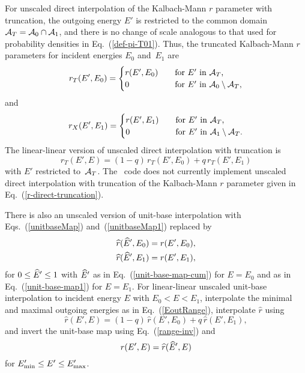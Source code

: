 {For unscaled direct interpolation of the Kalbach-Mann $r$ parameter with
truncation, the outgoing energy $E'$ is restricted to the common 
domain ${\cal A}_T = {\cal A}_0 \cap {\cal A}_1$, and there is no change
of scale analogous to that used for probability densities in
Eq.~(\ref{def-pi-T01}).  Thus, the truncated Kalbach-Mann $r$ parameters
for incident energies $E_0$ and~$E_1$ are
\begin{equation*}
  r_T(E', E_0 ) = \begin{cases}
    r(E', E_0 ) &\quad \text{for $E'$ in ${\cal A}_T$,} \\
    0 &\quad \text{for $E'$ in ${\cal A}_0 \setminus {\cal A}_T$,}
  \end{cases}
\end{equation*}
and
\begin{equation*}
  r_X(E', E_1 ) = \begin{cases}
    r(E', E_1 ) &\quad \text{for $E'$ in ${\cal A}_T$,} \\
    0 &\quad \text{for $E'$ in ${\cal A}_1 \setminus {\cal A}_T$.}
  \end{cases}
\end{equation*}
The linear-linear version of unscaled direct
interpolation with truncation is
\begin{equation}
  r_T(E', E ) = ( 1 - q )\, r_T(E', E_0 ) + q\, r_T(E', E_1 )
  \label{r-direct-truncation}
\end{equation}
with $E'$ restricted to~${\cal A}_T$.
The \gettransfer\ code does not currently implement unscaled direct
interpolation with truncation of the Kalbach-Mann $r$ parameter
given in Eq.~(\ref{r-direct-truncation}).

There is also an unscaled version of unit-base interpolation with
Eqs.~(\ref{unitbaseMap}) and~(\ref{unitbaseMap1}) replaced by
\begin{equation*}
 \begin{split}
  \widehat r(\widehat E', E_0) &= r(E', E_0), \\
  \widehat r(\widehat E', E_1) &= r(E', E_1), \\
 \end{split}
\end{equation*}
for $0 \le \widehat E' \le 1$ with $\widehat E'$ as in Eq.~(\ref{unit-base-map-cum})
for $E = E_0$ and as in Eq.~(\ref{unit-base-map1})
for $E = E_1$.  For linear-linear unscaled unit-base interpolation
to incident energy $E$ with $E_0 < E < E_1$, interpolate the
minimal and maximal outgoing energies as in Eq.~(\ref{EoutRange}),
interpolate $\widehat r$ using
$$
    \widehat r(E', E ) = ( 1 - q )\, \widehat r(E', E_0 ) + q\, \widehat r(E', E_1 ),
$$
and invert the unit-base map using Eq.~(\ref{range-inv})
and 
$$
  r(E', E) = \widehat r(\widehat E', E)
$$
for $E_{\text{min}}' \le E' \le E_{\text{max}}'$.

}
